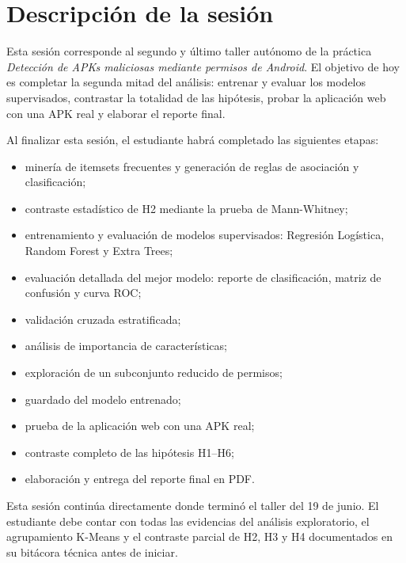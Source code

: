 \documentclass[
  coursetitle={Cómputo Nube y Tecnologías Emergentes},
  coursehours={96},
  coursedate={Verano 2026},
  doctype={Taller},
  otherlangs={english,french},
  authorname={Lázaro},
  authorsurname={Bustio-Martínez},
  authortitle={PhD},
  role={Profesor Investigador},
  email={lbustio@inaoe.mx},
  phone={5559504000},
  ext={7459},
  institution={Instituto Nacional de Astrofísica, Óptica y Electrónica (INAOE)},
  department={Maestría en Ciencias en Tecnologías de Seguridad},
  address={Luis Enrique Erro 1, Sta. Ma. Tonantzintla, San Andrés Cholula, CP 72840, Puebla, México},
  margin={0.5in}
]{../../lbustio_lecture_notes}
\begin{document}
\IberoCover

\section{Descripción de la sesión}

Esta sesión corresponde al segundo y último taller autónomo de la práctica \textit{Detección de APKs maliciosas mediante permisos de Android}. El objetivo de hoy es completar la segunda mitad del análisis: entrenar y evaluar los modelos supervisados, contrastar la totalidad de las hipótesis, probar la aplicación web con una APK real y elaborar el reporte final.

Al finalizar esta sesión, el estudiante habrá completado las siguientes etapas:

\begin{itemize}
    \item minería de itemsets frecuentes y generación de reglas de asociación y clasificación;
    \item contraste estadístico de H2 mediante la prueba de Mann-Whitney;
    \item entrenamiento y evaluación de modelos supervisados: Regresión Logística, Random Forest y Extra Trees;
    \item evaluación detallada del mejor modelo: reporte de clasificación, matriz de confusión y curva ROC;
    \item validación cruzada estratificada;
    \item análisis de importancia de características;
    \item exploración de un subconjunto reducido de permisos;
    \item guardado del modelo entrenado;
    \item prueba de la aplicación web con una APK real;
    \item contraste completo de las hipótesis H1--H6;
    \item elaboración y entrega del reporte final en PDF.
\end{itemize}

\begin{tcolorbox}[title=Prerequisito]
Esta sesión continúa directamente donde terminó el taller del 19 de junio. El estudiante debe contar con todas las evidencias del análisis exploratorio, el agrupamiento K-Means y el contraste parcial de H2, H3 y H4 documentados en su bitácora técnica antes de iniciar.
\end{tcolorbox}
\end{document}
